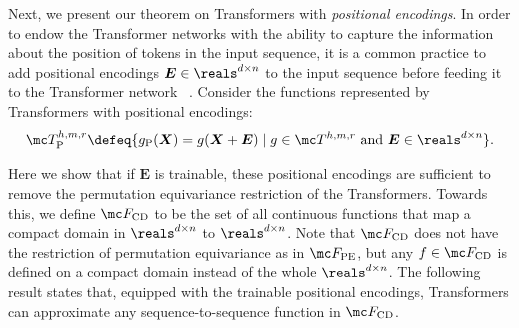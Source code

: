 \documentclass{article} %
\def\mE{{\bm{E}}}
\def\mX{{\bm{X}}}
\begin{document}

Next, we present our theorem on Transformers with \emph{positional encodings}. In order to endow the Transformer networks with the ability to capture the information about the position of tokens in the input sequence, it is a common practice to add positional encodings $\mE \in \reals^{d \times n}$ to the input sequence before feeding it to the Transformer network~ \citep{vaswani2017attention, devlin2018bert}. Consider the functions represented by Transformers with positional encodings: 
\begin{equation*}
    \mc T^{h, m, r}_{\rm P} \defeq \{ g_{\rm P}(\mX) = g(\mX+\mE) \mid g \in \mc T^{h, m, r} \text{ and } \mE \in \reals^{d \times n} \}.
\end{equation*}

Here we show that if $\mE$ is trainable, these positional encodings are sufficient to remove the permutation equivariance restriction of the Transformers. Towards this, we define $\mc F_{\rm CD}$ to be the set of all continuous functions that map a compact domain in $\reals^{d \times n}$ to $\reals^{d\times n}$. Note that $\mc F_{\rm CD}$ does not have the restriction of permutation equivariance as in $\mc F_{\rm PE}$, but any $f \in \mc F_{\rm CD}$ is defined on a compact domain instead of the whole $\reals^{d \times n}$. The following result states that, equipped with the trainable positional encodings, Transformers can approximate any sequence-to-sequence function in $\mc F_{\rm CD}$. 
 
\end{document}
